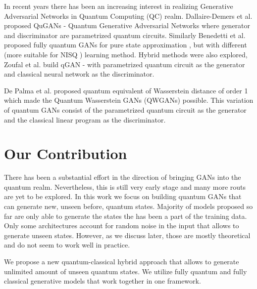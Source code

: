 In recent years there has been an increasing interest in realizing Generative
Adversarial Networks in Quantum Computing (QC) realm. Dallaire-Demers et al.
proposed QuGANs \cite{Dallaire_Demers_2018} - Quantum Generative Adversarial Networks
where generator and discriminator are parametrized quantum circuits. Similarly
Benedetti et al. proposed fully quantum GANs for pure state approximation \cite{Benedetti_2019}, but
with different (more suitable for NISQ \cite{Preskill_2018}) learning method.
Hybrid methods were also explored, Zoufal et al. build qGAN \cite{Zoufal_2019} -
with parametrized quantum circuit as the generator and classical neural network
as the discriminator. 

De Palma et al. proposed quantum equivalent of Wasserstein distance of order 1
\cite{depalma2020quantum} which made the Quantum Wasserstein GANs
(QWGANs) \cite{kiani2021quantum} possible. This variation of quantum GANs
consist of the parametrized quantum circuit as the generator and the classical linear
program as the discriminator.

\section{Our Contribution}
There has been a substantial effort in the direction of bringing GANs into the quantum
realm. Nevertheless, this is still very early stage and many more routs are yet
to be explored. In this work we focus on building quantum GANs that can generate
new, unseen before, quantum states. Majority of models proposed so far are only
able to generate the states the has been a part of the training data. Only some
architectures \cite{Dallaire_Demers_2018} account for random noise in the input
that allows to generate unseen states. However, as we discuss later, those are
mostly theoretical and do not seem to work well in practice.

We propose a new quantum-classical hybrid approach that allows to generate
unlimited amount of unseen quantum states. We utilize fully quantum and fully
classical generative models that work together in one framework.

